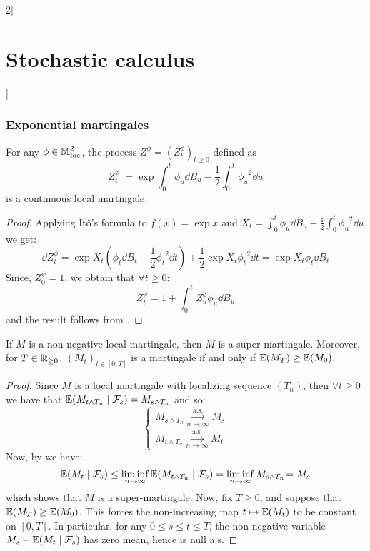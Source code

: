 \documentclass[../../../main_math.tex]{subfiles}
\begin{document}
\begin{multicols}{2}[\section{Stochastic calculus}]
  \subsubsection{Exponential martingales}
  \begin{lemma}
    For any $\phi\in\mathbb{M}^2_{\text{loc}}$, the process $Z^\phi={(Z_t^\phi)}_{t\geq 0}$ defined as
    $$
      Z_t^\phi:=\exp{\int_0^t \phi_u\dd{B_u}-\frac{1}{2}\int_0^t{\phi_u}^2\dd{u}}
    $$
    is a continuous local martingale.
  \end{lemma}
  \begin{proof}
    Applying Itô's formula to $f(x)=\exp{x}$ and $X_t=\int_0^t \phi_u\dd{B_u}-\frac{1}{2}\int_0^t{\phi_u}^2\dd{u}$ we get:
    \begin{equation*}
      \dd{Z^\phi_t} = \exp{X_t}\left( \phi_t\dd{B_t}-\frac{1}{2}{\phi_t}^2\dd{t}\right)+\frac{1}{2}\exp{X_t}{\phi_t}^2\dd{t}= \exp{X_t}\phi_t\dd{B_t}
    \end{equation*}
    Since, $Z^\phi_0=1$, we obtain that $\forall t \geq 0$:
    \begin{equation*}
      Z^\phi_t=1+\int_0^t Z^\phi_u\phi_u\dd{B_u}
    \end{equation*}
    and the result follows from .
  \end{proof}
  \begin{lemma}\label{SC:preNovikov}
    If $M$ is a non-negative local martingale, then $M$ is a super-martingale. Moreover, for $T\in \mathbb{R}_{\geq 0}$, ${(M_t)}_{t\in[0,T]}$ is a martingale if and only if $\mathbb{E}(M_T)\geq \mathbb{E}(M_0)$.
  \end{lemma}
  \begin{proof}
    Since $M$ is a local martingale with localizing sequence $(T_n)$, then $\forall t\geq 0$ we have that $\mathbb{E}(M_{t\wedge T_n}\mid \mathcal{F}_s )= M_{s\wedge T_n}$ and so:
    $$
      \begin{cases}
        M_{s\wedge T_n} \overset{\text{a.s.}}{\underset{n\to\infty}{\longrightarrow}} M_s \\
        M_{t \wedge T_n} \overset{\text{a.s.}}{\underset{n\to\infty}{\longrightarrow}} M_t
      \end{cases}
    $$
    Now, by  we have:
    $$
      \mathbb{E}(M_t\mid \mathcal{F}_s)\leq \liminf_{n\to\infty}\mathbb{E}(M_{t\wedge T_n}\mid \mathcal{F}_s)=\liminf_{n\to\infty}M_{s\wedge T_n}\!=M_s
    $$
    which shows that $M$ is a super-martingale. Now, fix $T\geq 0$, and suppose that $\mathbb{E}(M_T)\geq \mathbb{E}(M_0)$. This forces the non-increasing map $t\mapsto \mathbb{E}(M_t)$ to be constant on $[0,T]$. In particular, for any $0\leq s\leq t\leq T$, the non-negative variable $M_s-\mathbb{E}(M_t\mid \mathcal{F}_s)$ has zero mean, hence is null a.s.

\end{proof}
\end{multicols}
\end{document}

